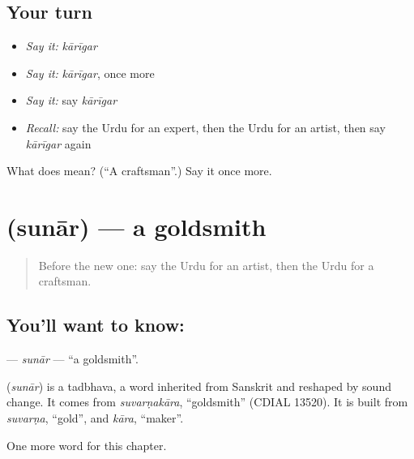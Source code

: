\subsection*{Your turn}
\begin{itemize}
\raggedright
  \item \emph{Say it:} \emph{kārīgar}
  \item \emph{Say it:} \emph{kārīgar}, once more
  \item \emph{Say it:} say \emph{kārīgar}
  \item \emph{Recall:} say the Urdu for an expert, then the Urdu for an artist, then say \emph{kārīgar} again
\end{itemize}

\begin{tcolorbox}[breakable,colback=teal!4,colframe=teal!35!black,title={Before you move on}]
What does  mean? (\textquotedblleft{}A craftsman\textquotedblright{}.) Say it once more.
\end{tcolorbox}
\section[\texorpdfstring{\ur{سنار} (sunār)}{سنار (sunār)}]{ (sunār) — a goldsmith}

\label{lesson:UR-C238-sunar}



\begin{quote}
Before the new one: say the Urdu for an artist, then the Urdu for a craftsman.
\end{quote}

\subsection*{You'll want to know: }
\textbf{} — \emph{sunār} — \textquotedblleft{}a goldsmith\textquotedblright{}.

\begin{cousinweb}
\textbf{} (\emph{sunār}) is a tadbhava, a word inherited from Sanskrit and reshaped by sound change. It comes from \emph{suvarṇakāra}, \textquotedblleft{}goldsmith\textquotedblright{} (CDIAL 13520). It is built from \emph{suvarṇa}, \textquotedblleft{}gold\textquotedblright{}, and \emph{kāra}, \textquotedblleft{}maker\textquotedblright{}.
\end{cousinweb}

\begin{grammarlens}[title={What you've built}]
One more word for this chapter.
\end{grammarlens}

